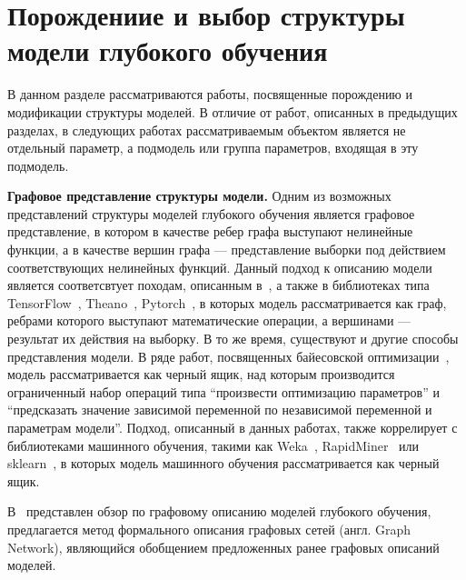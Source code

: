 \section{Порождениие и выбор структуры модели глубокого обучения}
В данном разделе рассматриваются работы, посвященные порождению и модификации структуры моделей. В отличие от работ, описанных в предыдущих разделах, в следующих работах рассматриваемым объектом является не отдельный параметр, а подмодель или группа параметров, входящая в эту подмодель.
 



\textbf{Графовое представление структуры модели. }
Одним из возможных представлений структуры моделей глубокого обучения является графовое представление, в котором в качестве ребер графа выступают нелинейные функции, а в качестве вершин графа --- представление выборки под действием соответствующих нелинейных функций. 
Данный подход к описанию модели является соответсвтует  походам, описанным в~\cite{vokov}, а также в библиотеках типа TensorFlow~\cite{tensorflow}, Theano~\cite{theano}, Pytorch~\cite{pytorch}, в которых модель рассматривается как граф, ребрами которого выступают математические операции, а вершинами --- результат их действия на выборку. 
 В то же время, существуют и другие способы представления модели. В ряде работ, посвященных байесовской оптимизации~\cite{snoek_deep,rbf_surrogate,bo_gp}, модель рассматривается как черный ящик, над которым производится ограниченный набор операций типа ``произвести оптимизацию параметров'' и ``предсказать значение зависимой переменной по независимой переменной и параметрам модели''.
Подход, описанный в данных работах, также коррелирует с  библиотеками машинного обучения, такими как Weka~\cite{weka}, RapidMiner~\cite{rapidminer} или sklearn~\cite{sklearn}, в которых модель машинного обучения рассматривается как черный ящик.

В~\cite{graphs} представлен обзор по графовому описанию моделей глубокого обучения, предлагается метод формального описания графовых сетей (англ. Graph Network), являющийся обобщением предложенных ранее графовых описаний моделей.


